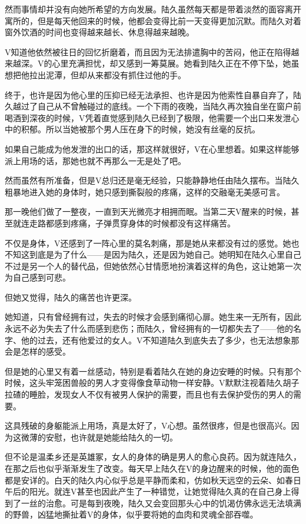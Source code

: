 然而事情却并没有向她所希望的方向发展。陆久虽然每天都是带着淡然的面容离开寓所的，但是每天他回来的时候，他都会变得比前一天变得更加沉默。而陆久对着窗外饮酒的时间也变得越来越长、休息得越来越晚。

V知道他依然被往日的回忆折磨着，而且因为无法排遣胸中的苦闷，他正在陷得越来越深。V的心里充满担忧，却又感到一筹莫展。她看到陆久正在不停下坠，她虽想把他拉出泥潭，但却从来都没有抓住过他的手。

终于，也许是因为他心里的压抑已经无法承担、也许是因为他索性自暴自弃了，陆久越过了自己从不曾触碰过的底线。一个下雨的夜晚，当陆久再次独自坐在窗户前喝酒到深夜的时候，V凭着直觉感到陆久已经到了极限，他需要一个出口来发泄心中的积郁。所以当她被那个男人压在身下的时候，她没有丝毫的反抗。

如果自己能成为他发泄的出口的话，那这样就很好，V在心里想着。如果这样能够派上用场的话，那她也就不再那么一无是处了吧。

然而虽然有所准备，但是V总归还是毫无经验，只能静静地任由陆久摆布。当陆久粗暴地进入她的身体时，她只感到撕裂般的疼痛，这样的交融毫无美感可言。

那一晚他们做了一整夜，一直到天光微亮才相拥而眠。当第二天V醒来的时候，甚至就连走路都感到疼痛，子弹贯穿身体的时候都没有这样痛苦。

不仅是身体，V还感到了一阵心里的莫名刺痛，那是她从来都没有过的感觉。她也不知这到底是为了什么——是因为陆久，还是因为她自己。她明知在陆久心里自己不过是另一个人的替代品，但她依然心甘情愿地扮演着这样的角色，这让她第一次为自己感到可悲。

但她又觉得，陆久的痛苦也许更深。

她知道，只有曾经拥有过，失去的时候才会感到痛彻心扉。她生来一无所有，因此永远不必为失去了什么而感到悲伤；而陆久，曾经拥有的一切都失去了——他的名字、他的过去，还有他爱过的女人。V不知道陆久到底失去了多少，也无法想象那会是怎样的感受。

但是她的心里又有着一丝感动，特别是看着陆久在她的身边安睡的时候。只有那个时候，这头牢笼困兽般的男人才变得像食草动物一样安静。V默默注视着陆久胡子拉碴的睡脸，发现女人不仅有被男人保护的需要，而且也有去保护受伤的男人的需要。

这具残破的身躯能派上用场，真是太好了，V心想。虽然很疼，但是也很高兴。因为这微薄的安慰，也许就是她能给陆久的一切。

但不论是温柔乡还是英雄冢，女人的身体的确是男人的愈心良药。因为就连陆久，在那之后也似乎渐渐发生了改变。每天早上陆久在V的身边醒来的时候，他的面色都是安详的。白天的陆久内心似乎总是平静而柔和，仿如秋天远空的云朵、如春日午后的阳光。就连V甚至也因此产生了一种错觉，让她觉得陆久真的在自己身上得到了一丝的治愈。可是每到夜晚，陆久又会变回那头心中的饥渴仿佛永远无法填满的野兽，凶猛地撕扯着V的身体，似乎要将她的血肉和灵魂全部吞噬。

